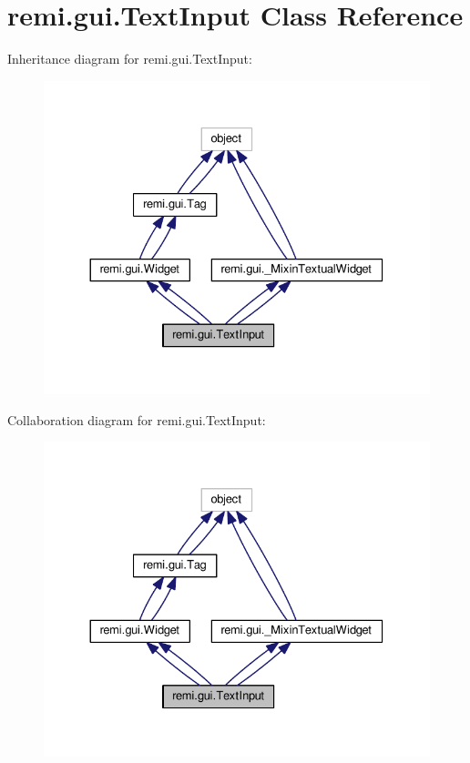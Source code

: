 \hypertarget{classremi_1_1gui_1_1TextInput}{}\section{remi.\+gui.\+Text\+Input Class Reference}
\label{classremi_1_1gui_1_1TextInput}


Inheritance diagram for remi.\+gui.\+Text\+Input\+:
\nopagebreak
\begin{figure}[H]
\begin{center}
\leavevmode
\includegraphics[width=330pt]{d9/de2/classremi_1_1gui_1_1TextInput__inherit__graph}
\end{center}
\end{figure}


Collaboration diagram for remi.\+gui.\+Text\+Input\+:
\nopagebreak
\begin{figure}[H]
\begin{center}
\leavevmode
\includegraphics[width=330pt]{d9/d17/classremi_1_1gui_1_1TextInput__coll__graph}
\end{center}
\end{figure}
